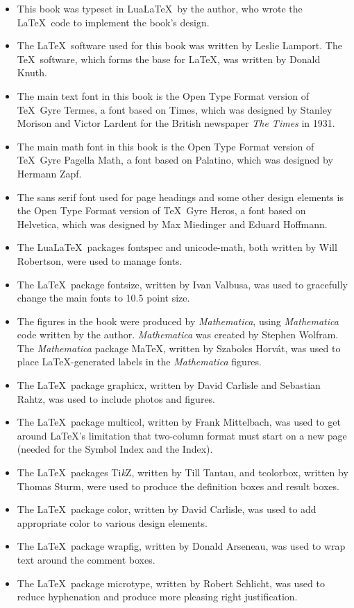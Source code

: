 \begin{itemize}
\item This book was typeset in Lua\LaTeX\ by the author, who wrote the \LaTeX\
  code to implement the book's design.
\item The \LaTeX\ software used for this book was written by Leslie Lamport.
  The \TeX\ software, which forms the base for \LaTeX, was written by Donald
  Knuth.
\item The main text font in this book is the Open Type Format version of \TeX\
  Gyre Termes, a font based on Times, which was designed by Stanley Morison and
  Victor Lardent for the British newspaper \emph{The Times} in 1931.
\item The main math font in this book is the Open Type Format version of \TeX\
  Gyre Pagella Math, a font based on Palatino, which was designed by Hermann
  Zapf.
\item The sans serif font used for page headings and some other design elements
  is the Open Type Format version of \TeX\ Gyre Heros, a font based on
  Helvetica, which was designed by Max Miedinger and Eduard Hoffmann.
\item The Lua\LaTeX\ packages fontspec and unicode-math, both written by Will
  Robertson, were used to manage fonts.
\item The \LaTeX\ package fontsize, written by Ivan Valbusa, was used to
  gracefully change the main fonts to 10.5 point size.
\item The figures in the book were produced by \emph{Mathematica}, using
  \emph{Mathematica} code written by the author. \emph{Mathematica} was created
  by Stephen Wolfram. The \emph{Mathematica} package MaTeX, written by Szabolcs
  Horvát, was used to place \LaTeX-generated labels in the \emph{Mathematica}
  figures.
\item The \LaTeX\ package graphicx, written by David Carlisle and Sebastian
  Rahtz, was used to include photos and figures.
\item The \LaTeX\ package multicol, written by Frank Mittelbach, was used to get
  around \LaTeX's limitation that two-column format must start on a new page
  (needed for the Symbol Index and the Index).
\item The \LaTeX\ packages Ti\emph{k}Z, written by Till Tantau, and tcolorbox,
  written by Thomas Sturm, were used to produce the definition boxes and result
  boxes.
\item The \LaTeX\ package color, written by David Carlisle, was used to add
  appropriate color to various design elements.
\item The \LaTeX\ package wrapfig, written by Donald Arseneau, was used to wrap
  text around the comment boxes.
\item The \LaTeX\ package microtype, written by Robert Schlicht, was used to
  reduce hyphenation and produce more pleasing right justification.
\end{itemize}
